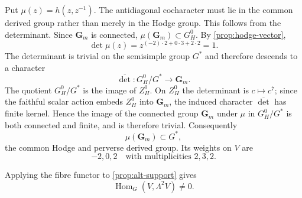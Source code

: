 \documentclass[10pt]{amsart}
\numberwithin{equation}{section}
\theoremstyle{definition}
\theoremstyle{remark}
\newcommand{\GGm}{\mathbf G_m}
\begin{document}
Put $\mu(z)=h(z,z^{-1})$.  The antidiagonal cocharacter must lie in the
common derived group rather than merely in the Hodge group.  This follows from
the determinant.  Since $\GGm$ is connected,
$\mu(\GGm)\subset G_H^0$.  By \cref{prop:hodge-vector},
\[
 \det\mu(z)=z^{(-2)\cdot2+0\cdot3+2\cdot2}=1.
\]
The determinant is trivial on the semisimple group $G^*$ and therefore
descends to a character
\[
 \overline{\det}:G_H^0/G^*\longrightarrow\GGm.
\]
The quotient $G_H^0/G^*$ is the image of $Z_H^0$.  On $Z_H^0$ the
determinant is $c\mapsto c^7$; since the faithful scalar action embeds
$Z_H^0$ into $\GGm$, the induced character $\overline{\det}$ has finite
kernel.  Hence the image of the connected group $\GGm$ under $\mu$ in
$G_H^0/G^*$ is both connected and finite, and is therefore trivial.
Consequently
\[
 \mu(\GGm)\subset G^*,
\]
the common Hodge and perverse derived group.  Its weights on $V$ are
\begin{equation}
 -2,0,2\quad\text{with multiplicities }2,3,2.
\label{eq:hodge-weights}
\end{equation}

Applying the fibre functor to \cref{prop:alt-support} gives
\begin{equation}
 \operatorname{Hom}_G(V,\Lambda^2V)\ne0.
\label{eq:hom-exterior}
\end{equation}
\end{document}

